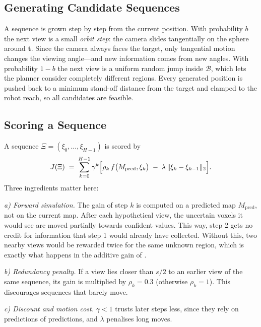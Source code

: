 \subsection{Generating Candidate Sequences}
\label{sec:method-candidates}

A sequence is grown step by step from the current position. With
probability $b$ the next view is a small \emph{orbit step}: the camera
slides tangentially on the sphere around $\mathbf{t}$. Since the camera
always faces the target, only tangential motion changes the viewing
angle---and new information comes from new angles. With probability
$1-b$ the next view is a uniform random jump inside $\mathcal{B}$, which
lets the planner consider completely different regions. Every generated
position is pushed back to a minimum stand-off distance from the target
and clamped to the robot reach, so all candidates are feasible.

\subsection{Scoring a Sequence}
\label{sec:method-evaluation}

A sequence $\Xi = (\xi_0, \dots, \xi_{H-1})$ is scored by
%
\begin{equation}
  J(\Xi) \;=\; \sum_{k=0}^{H-1} \gamma^{k}
  \Bigl[ \rho_k\, f\bigl(M_{\mathrm{pred}}, \xi_k\bigr)
  \;-\; \lambda\, \lVert \xi_k - \xi_{k-1} \rVert_2 \Bigr].
  \label{eq:objective}
\end{equation}
%
Three ingredients matter here:

\emph{a) Forward simulation.} The gain of step $k$ is computed on a
predicted map $M_{\mathrm{pred}}$, not on the current map. After each
hypothetical view, the uncertain voxels it would see are moved partially
towards confident values. This way, step 2 gets no credit for
information that step 1 would already have collected. Without this, two
nearby views would be rewarded twice for the same unknown region, which
is exactly what happens in the additive gain of
\cite{bircher2016, zhang2022}.

\emph{b) Redundancy penalty.} If a view lies closer than $s/2$ to an
earlier view of the same sequence, its gain is multiplied by
$\rho_k = 0.3$ (otherwise $\rho_k = 1$). This discourages sequences that
barely move.

\emph{c) Discount and motion cost.} $\gamma < 1$ trusts later steps
less, since they rely on predictions of predictions, and $\lambda$
penalises long moves.

